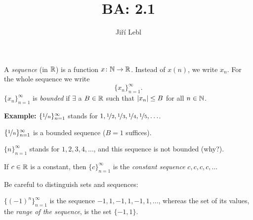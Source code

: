 \documentclass[10pt,aspectratio=149]{beamer}
\author{Ji\v{r}\'i Lebl}
\institute[OSU]{%
Departemento pri Matematiko de Oklahoma {\^S}tata Universitato}
\title{BA: 2.1}
\date{}
\begin{document}
\begin{frame}
\titlepage
\end{frame}

\begin{frame}
\begin{definition}
A \emph{sequence} (in ${\mathbb{R}}$) is a function $x \colon {\mathbb{N}} \to
{\mathbb{R}}$.  Instead of $x(n)$, we write $x_n$.  For the whole sequence
we write
\begin{equation*}
\{ x_n \}_{n=1}^\infty .
\end{equation*}
\pause
$\{ x_n \}_{n=1}^\infty$ is \emph{bounded} if
$\exists$ a $B \in {\mathbb{R}}$ such that
\quad
$\left\lvert {x_n} \right\rvert \leq B$ \quad for all $n \in {\mathbb{N}}$.
\end{definition}

\pause

\textbf{Example:}
$\{ \nicefrac{1}{n} \}_{n=1}^\infty$ stands for
$1, \nicefrac{1}{2}, \nicefrac{1}{3}, \nicefrac{1}{4}, \nicefrac{1}{5}, \ldots$.

\pause
$\{ \nicefrac{1}{n} \}_{n=1}^\infty$
is a bounded sequence ($B=1$ suffices).

\medskip
\pause

$\{ n \}_{n=1}^\infty$ stands for
$1,2,3,4,\ldots$, and this sequence is not bounded (why?).

\medskip
\pause

If $c \in {\mathbb{R}}$ is a constant, then $\{ c \}_{n=1}^\infty$
is the \emph{constant sequence}
$c,c,c,c,\ldots$

\medskip
\pause

Be careful to distinguish sets and sequences:

$\{ {(-1)}^n \}_{n=1}^\infty$ is the sequence
$-1,1,-1,1,-1,1,\ldots$, whereas the set of its values, the
\emph{range of the sequence},
is the set $\{ -1, 1 \}$.

\end{frame}
\end{document}
